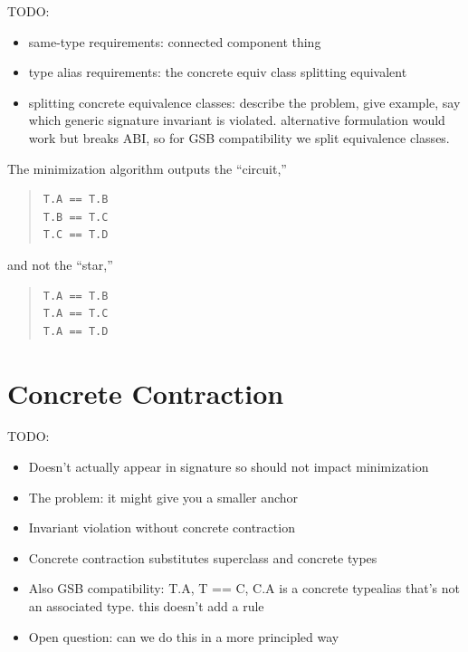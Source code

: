 \documentclass[../generics]{subfiles}
\begin{document}
\ifWIP


TODO:
\begin{itemize}
\item same-type requirements: connected component thing
\item type alias requirements: the concrete equiv class splitting equivalent
\item splitting concrete equivalence classes: describe the problem, give example, say which generic signature invariant is violated. alternative formulation would work but breaks ABI, so for GSB compatibility we split equivalence classes.
\end{itemize}

The minimization algorithm outputs the ``circuit,''
\begin{quote}
\begin{verbatim}
T.A == T.B
T.B == T.C
T.C == T.D
\end{verbatim}
\end{quote}
and not the ``star,''
\begin{quote}
\begin{verbatim}
T.A == T.B
T.A == T.C
T.A == T.D
\end{verbatim}
\end{quote}

\fi

\section[]{Concrete Contraction}\label{concrete contraction}



\ifWIP
TODO:
\begin{itemize}
\item Doesn't actually appear in signature so should not impact minimization
\item The problem: it might give you a smaller anchor
\item Invariant violation without concrete contraction
\item Concrete contraction substitutes superclass and concrete types
\item Also GSB compatibility: T.A, T == C, C.A is a concrete typealias that's not an associated type. this doesn't add a rule
\item Open question: can we do this in a more principled way
\end{itemize}
\fi
\end{document}

